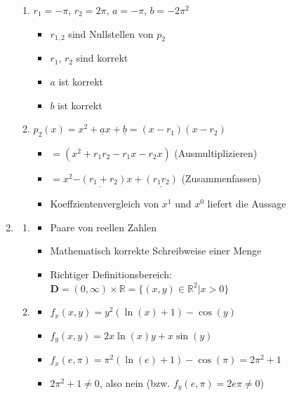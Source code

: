 \documentclass[12pt]{article}
\begin{document}
\begin{enumerate}
\begin{enumerate}
\item $r_1 = -\pi$, $r_2 = 2\pi$, $a = -\pi$, $b = -2\pi^2$
\begin{itemize}
\item $r_{1,2}$ sind Nullstellen von $p_2$
\item $r_1$, $r_2$ sind korrekt
\item $a$ ist korrekt
\item $b$ ist korrekt
\end{itemize}

\item $p_2(x) = x^2 + \underline{a}x + \underline{b} = (x-r_1)(x-r_2)$
\begin{itemize}
\item $= (x^2+r_1r_2-r_1x-r_2x)$ (Ausmultiplizieren)
\item $= x^2 \underline{-(r_1+r_2)}x+\underline{(r_1r_2)}$ (Zusammenfassen)
\item  Koeffzientenvergleich von  $x^1$ und $x^0$ liefert die Aussage
\end{itemize}

\end{enumerate}


\item
\begin{enumerate}

\item
\begin{itemize}
\item Paare von reellen Zahlen
\item Mathematisch korrekte Schreibweise einer Menge
\item Richtiger Definitionsbereich: $\mathbf{D} = (0,\infty)\times\mathbb{R} = \lbrace (x,y) \in \mathbb{R}^2 | x > 0 \rbrace$
\end{itemize}

\item
\begin{itemize}
\item $f_x(x,y) = y^2 (\ln(x)+1) - \cos(y)$
\item $f_y(x,y) = 2x\ln(x)y +x\sin(y)$
\item $f_x(e,\pi) = \pi^2 (\ln(e)+1) - \cos(\pi) = 2\pi^2+1$
\item $2\pi^2+1 \ne 0$, also nein (bzw. $f_y(e,\pi)=2e\pi \ne 0$)
\end{itemize}

\end{enumerate}



\end{enumerate}
\end{document}
